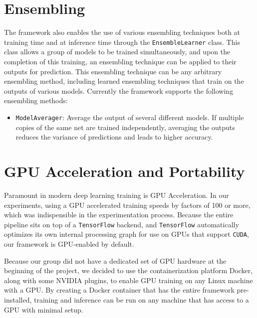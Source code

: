 \section{Ensembling}

The framework also enables the use of various ensembling techniques both at training time and at inference time through the \texttt{EnsembleLearner} class. This class allows a group of models to be trained simultaneously, and upon the completion of this training, an ensembling technique can be applied to their outputs for prediction. This ensembling technique can be any arbitrary ensembling method, including learned ensembling techniques that train on the outputs of various models. Currently the framework supports the following ensembling methods:

\begin{itemize}
	\item \texttt{ModelAverager}: Average the output of several different models. If multiple copies of the same net are trained independently, averaging the outputs reduces the variance of predictions and leads to higher accuracy.
\end{itemize}

\section{GPU Acceleration and Portability}

Paramount in modern deep learning training is GPU Acceleration. In our experiments, using a GPU accelerated training speeds by factors of 100 or more, which was indispensible in the experimentation process. Because the entire pipeline sits on top of a \texttt{TensorFlow} backend, and \texttt{TensorFlow} automatically optimizes its own internal processing graph for use on GPUs that support \texttt{CUDA}, our framework is GPU-enabled by default.

Because our group did not have a dedicated set of GPU hardware at the beginning of the project, we decided to use the containerization platform Docker, along with some NVIDIA plugins, to enable GPU training on any Linux machine with a GPU. By creating a Docker container that has the entire framework pre-installed, training and inference can be run on any machine that has access to a GPU with minimal setup.

